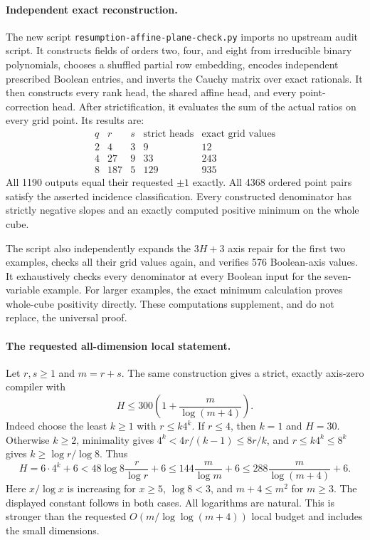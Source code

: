 \documentclass[11pt]{article}
\begin{document}
\paragraph{Independent exact reconstruction.}
The new script \texttt{resumption-affine-plane-check.py} imports no
upstream audit script. It constructs fields of orders two, four, and
eight from irreducible binary polynomials, chooses a shuffled partial
row embedding, encodes independent prescribed Boolean entries, and
inverts the Cauchy matrix over exact rationals. It then constructs every
rank head, the shared affine head, and every point-correction head.
After strictification, it evaluates the sum of the actual ratios on
every grid point. Its results are:
\[
\begin{array}{c|c|c|c|c}
q&r&s&\text{strict heads}&\text{exact grid values}\\\hline
2&4&3&9&12\\
4&27&9&33&243\\
8&187&5&129&935
\end{array}
\]
All 1190 outputs equal their requested $\pm1$ exactly. All 4368 ordered
point pairs satisfy the asserted incidence classification. Every
constructed denominator has strictly negative slopes and an exactly
computed positive minimum on the whole cube.

The script also independently expands the $3H+3$ axis repair for the
first two examples, checks all their grid values again, and verifies
576 Boolean-axis values. It exhaustively checks every denominator at
every Boolean input for the seven-variable example. For larger examples,
the exact minimum calculation proves whole-cube positivity directly.
These computations supplement, and do not replace, the universal proof.

\paragraph{The requested all-dimension local statement.}
Let $r,s\geq1$ and $m=r+s$. The same construction gives a strict,
exactly axis-zero compiler with
\[
 H\leq300\left(1+\frac{m}{\log(m+4)}\right).
\]
Indeed choose the least $k\geq1$ with $r\leq k4^k$. If $r\leq4$, then
$k=1$ and $H=30$. Otherwise $k\geq2$, minimality gives
$4^k<4r/(k-1)\leq8r/k$, and $r\leq k4^k\leq8^k$ gives
$k\geq\log r/\log8$. Thus
\[
 H=6\cdot4^k+6
 <48\log8\frac r{\log r}+6
 \leq144\frac m{\log m}+6
 \leq288\frac m{\log(m+4)}+6.
\]
Here $x/\log x$ is increasing for $x\geq5$, $\log8<3$, and
$m+4\leq m^2$ for $m\geq3$. The displayed constant follows in both
cases. All logarithms are natural. This is stronger than the requested
$O(m/\log\log(m+4))$ local budget and includes the small dimensions.
\end{document}

